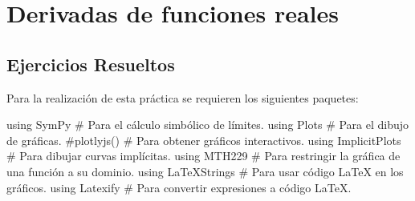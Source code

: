\documentclass[
  a4paper,
]{scrreport}
\newenvironment{Shaded}{\begin{snugshade}}{\end{snugshade}}
\newcommand{\BuiltInTok}[1]{\textcolor[rgb]{0.00,0.23,0.31}{#1}}
\newcommand{\CommentTok}[1]{\textcolor[rgb]{0.37,0.37,0.37}{#1}}
\newcommand{\ImportTok}[1]{\textcolor[rgb]{0.00,0.46,0.62}{#1}}
\theoremstyle{definition}
\theoremstyle{remark}
\begin{document}

\hypertarget{derivadas-de-funciones-reales}{%
\chapter{Derivadas de funciones
reales}\label{derivadas-de-funciones-reales}}

\hypertarget{ejercicios-resueltos-3}{%
\section{Ejercicios Resueltos}\label{ejercicios-resueltos-3}}

Para la realización de esta práctica se requieren los siguientes
paquetes:

\begin{Shaded}
\begin{Highlighting}[]
\ImportTok{using} \BuiltInTok{SymPy  }\CommentTok{\# Para el cálculo simbólico de límites.}
\ImportTok{using} \BuiltInTok{Plots  }\CommentTok{\# Para el dibujo de gráficas.}
\CommentTok{\#plotlyjs() \# Para obtener gráficos interactivos.}
\ImportTok{using} \BuiltInTok{ImplicitPlots }\CommentTok{\# Para dibujar curvas implícitas.}
\ImportTok{using} \BuiltInTok{MTH229 }\CommentTok{\# Para restringir la gráfica de una función a su dominio.}
\ImportTok{using} \BuiltInTok{LaTeXStrings  }\CommentTok{\# Para usar código LaTeX en los gráficos.}
\ImportTok{using} \BuiltInTok{Latexify  }\CommentTok{\# Para convertir expresiones a código LaTeX.}
\end{Highlighting}
\end{Shaded}
\end{document}
